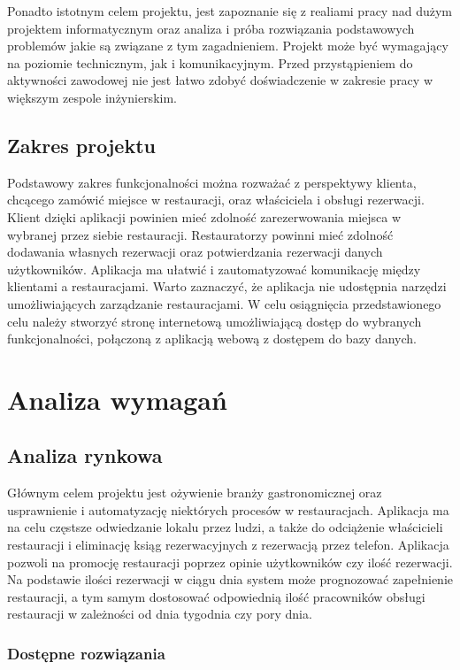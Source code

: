 \documentclass{article}
\begin{document}
Ponadto istotnym celem projektu, jest zapoznanie się z realiami pracy nad dużym projektem informatycznym oraz analiza i próba rozwiązania podstawowych problemów jakie są związane z tym zagadnieniem. Projekt może być wymagający na poziomie technicznym, jak i komunikacyjnym. Przed przystąpieniem do aktywności zawodowej nie jest łatwo zdobyć doświadczenie w zakresie pracy w większym zespole inżynierskim.
\subsection{Zakres projektu}
Podstawowy zakres funkcjonalności można rozważać z perspektywy klienta, chcącego zamówić miejsce w restauracji, oraz właściciela i obsługi rezerwacji. Klient dzięki aplikacji powinien mieć zdolność zarezerwowania miejsca w wybranej przez siebie restauracji. Restauratorzy powinni mieć zdolność dodawania własnych rezerwacji oraz potwierdzania rezerwacji danych użytkowników. Aplikacja ma ułatwić i zautomatyzować komunikację między klientami a restauracjami. Warto zaznaczyć, że aplikacja nie udostępnia narzędzi umożliwiających zarządzanie restauracjami. W celu osiągnięcia przedstawionego celu należy stworzyć stronę internetową umożliwiającą dostęp do wybranych funkcjonalności, połączoną z aplikacją webową z dostępem do bazy danych.

\newpage

\section{Analiza wymagań}

\subsection{Analiza rynkowa}
Głównym celem projektu jest ożywienie branży gastronomicznej oraz usprawnienie i automatyzację niektórych procesów w restauracjach. Aplikacja ma na celu częstsze odwiedzanie lokalu przez ludzi, a także do odciążenie właścicieli restauracji i eliminację ksiąg rezerwacyjnych z rezerwacją przez telefon. Aplikacja pozwoli na promocję restauracji poprzez opinie użytkowników czy ilość rezerwacji. Na podstawie ilości rezerwacji w ciągu dnia system może prognozować zapełnienie restauracji, a tym samym dostosować odpowiednią ilość pracowników obsługi restauracji w zależności od dnia tygodnia czy pory dnia. 

\subsubsection{Dostępne rozwiązania}
\end{document}
